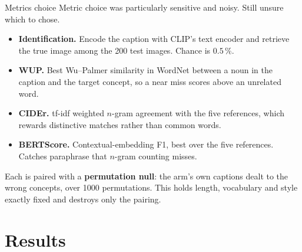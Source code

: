 \documentclass[aspectratio=169,10pt]{beamer}
\newcommand{\pct}{\,\%}
\begin{document}
\begin{frame}{Metrics choice}
  \small
  Metric choice was particularly sensitive and noisy. Still unsure which to chose.

  \vspace{0.45em}
  \begin{itemize}
    \item \textbf{Identification.} Encode the caption with CLIP's text encoder and retrieve the
          true image among the 200 test images. Chance is $0.5\pct$.
    \item \textbf{WUP.} Best Wu--Palmer similarity in WordNet between a noun in the caption and
          the target concept, so a near miss scores above an unrelated word.
    \item \textbf{CIDEr.} tf-idf weighted $n$-gram agreement with the five references, which
          rewards distinctive matches rather than common words.
    \item \textbf{BERTScore.} Contextual-embedding F1, best over the five references. Catches
          paraphrase that $n$-gram counting misses.
  \end{itemize}

  \vspace{0.35em}
  Each is paired with a \textbf{permutation null}: the arm's own captions dealt to the wrong
  concepts, over 1000 permutations. This holds length, vocabulary and style exactly fixed and
  destroys only the pairing.

\end{frame}

\section{Results}
\end{document}
